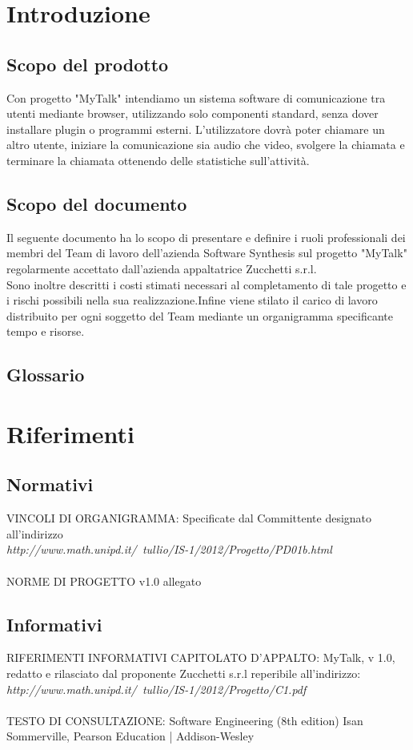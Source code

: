 \section{Introduzione}
\subsection{Scopo del prodotto}
Con progetto "MyTalk" intendiamo un sistema software di comunicazione tra utenti mediante browser, utilizzando solo componenti standard, senza dover installare plugin o programmi esterni. L'utilizzatore dovrà poter chiamare un altro utente, iniziare la comunicazione sia audio che video, svolgere la chiamata e terminare la chiamata ottenendo delle statistiche sull'attività.

\subsection{Scopo del documento}
Il seguente documento ha lo scopo di presentare e definire i ruoli professionali dei membri del Team di lavoro dell'azienda Software Synthesis sul progetto "MyTalk" regolarmente accettato dall'azienda appaltatrice Zucchetti s.r.l.\\
Sono inoltre descritti i costi stimati necessari al completamento di tale progetto e i rischi possibili nella sua realizzazione.Infine viene stilato il carico di lavoro distribuito per ogni soggetto del Team mediante un organigramma specificante tempo e risorse.
\subsection{Glossario}

\section{Riferimenti}
\subsection{Normativi}
VINCOLI DI ORGANIGRAMMA: Specificate dal Committente designato all'indirizzo\\ \textit{http://www.math.unipd.it/~tullio/IS-1/2012/Progetto/PD01b.html} \\\\
NORME DI PROGETTO  v1.0 allegato

\subsection{Informativi}
RIFERIMENTI INFORMATIVI
CAPITOLATO D'APPALTO: MyTalk, v 1.0, redatto e rilasciato dal proponente Zucchetti s.r.l reperibile all'indirizzo:\\ \textit{http://www.math.unipd.it/~tullio/IS-1/2012/Progetto/C1.pdf} \\\\
TESTO DI CONSULTAZIONE: Software Engineering (8th edition) Isan Sommerville, Pearson Education | Addison-Wesley



